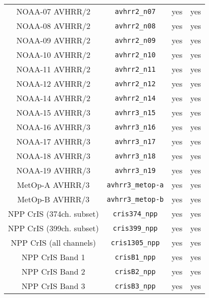 \begin{center}
\begin{longtable}{c c c c}
  NOAA-07 AVHRR/2                    & \texttt{avhrr2\_n07}         &  yes     &  yes       \\
  NOAA-08 AVHRR/2                    & \texttt{avhrr2\_n08}         &  yes     &  yes       \\
  NOAA-09 AVHRR/2                    & \texttt{avhrr2\_n09}         &  yes     &  yes       \\
  NOAA-10 AVHRR/2                    & \texttt{avhrr2\_n10}         &  yes     &  yes       \\
  NOAA-11 AVHRR/2                    & \texttt{avhrr2\_n11}         &  yes     &  yes       \\
  NOAA-12 AVHRR/2                    & \texttt{avhrr2\_n12}         &  yes     &  yes       \\
  NOAA-14 AVHRR/2                    & \texttt{avhrr2\_n14}         &  yes     &  yes       \\
  NOAA-15 AVHRR/3                    & \texttt{avhrr3\_n15}         &  yes     &  yes       \\
  NOAA-16 AVHRR/3                    & \texttt{avhrr3\_n16}         &  yes     &  yes       \\
  NOAA-17 AVHRR/3                    & \texttt{avhrr3\_n17}         &  yes     &  yes       \\
  NOAA-18 AVHRR/3                    & \texttt{avhrr3\_n18}         &  yes     &  yes       \\
  NOAA-19 AVHRR/3                    & \texttt{avhrr3\_n19}         &  yes     &  yes       \\
  MetOp-A AVHRR/3                    & \texttt{avhrr3\_metop-a}     &  yes     &  yes       \\
  MetOp-B AVHRR/3                    & \texttt{avhrr3\_metop-b}     &  yes     &  yes       \\
  NPP CrIS (374ch. subset)           & \texttt{cris374\_npp}        &  yes     &  yes       \\
  NPP CrIS (399ch. subset)           & \texttt{cris399\_npp}        &  yes     &  yes       \\
  NPP CrIS (all channels)            & \texttt{cris1305\_npp}       &  yes     &  yes       \\
  NPP CrIS Band 1                    & \texttt{crisB1\_npp}         &  yes     &  yes       \\
  NPP CrIS Band 2                    & \texttt{crisB2\_npp}         &  yes     &  yes       \\
  NPP CrIS Band 3                    & \texttt{crisB3\_npp}         &  yes     &  yes       \\

\end{longtable}
\end{center}
